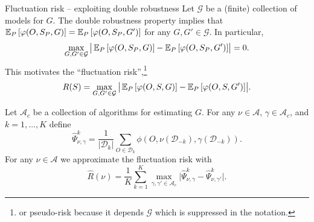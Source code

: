 \documentclass[smaller]{beamer}\usepackage{listings}
\begin{document}
\begin{frame}[label={sec:orgaf9d58d}]{Fluctuation risk -- exploiting double robustness}
\small Let \(\mathcal{G}\) be a (finite) collection of models for \(G\). The double robustness
property implies that
\(\operatorname{\mathbb{E}}_P{\left[ \varphi(O, S_P, G) \right]} = \operatorname{\mathbb{E}}_P{\left[ \varphi(O, S_P, G') \right]}\) for any
\(G, G' \in \mathcal{G}\). In particular,
\begin{equation*}
  \max_{G, G' \in \mathcal{G}}\big\vert
  \operatorname{\mathbb{E}}_P{\left[ \varphi(O, S_P, G) \right]}
  - \operatorname{\mathbb{E}}_P{\left[ \varphi(O, S_P, G') \right]}     
  \big\vert
  = 0.
\end{equation*}
This motivates the ``fluctuation risk'',\footnote{or pseudo-risk because it depends \(\mathcal{G}\) which is suppressed in the notation.}
\begin{equation*}
  R(S)
  =
  \max_{G, G' \in \mathcal{G}}\big\vert
  \operatorname{\mathbb{E}}_P{\left[ \varphi(O, S, G) \right]}
  - \operatorname{\mathbb{E}}_P{\left[ \varphi(O, S, G') \right]}     
  \big\vert.
\end{equation*}

Let $\mathcal{A}_c$ be a collection of algorithms for estimating \(G\). For any $\nu \in \mathcal{A}$,
$\gamma \in \mathcal{A}_c$, and \(k = 1, \dots, K\) define
\begin{equation*}
  \hat{\Psi}_{\nu, \gamma}^k =
  \frac{1}{|\mathcal{D}_k|} \sum_{O \in \mathcal{D}_k}
  \phi(O, \nu(\mathcal{D}_{-k}), \gamma(\mathcal{D}_{-k})).
\end{equation*}
For any $\nu \in \mathcal{A}$ we approximate the fluctuation risk with
\begin{equation*}
  \hat R(\nu) =
  \frac{1}{K}
  \sum_{k=1}^{K}
  \max_{\gamma, \gamma' \in \mathcal{A}_c}
  \big|\hat{\Psi}_{\nu, \gamma}^k -
  \hat{\Psi}_{\nu, \gamma'}^k\big|.  
\end{equation*}
\end{frame}
\end{document}
